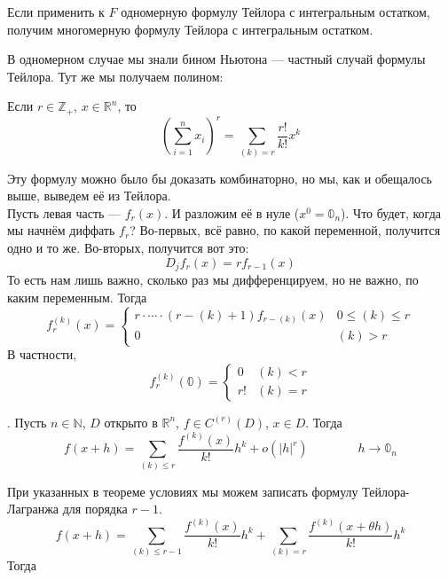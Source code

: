\documentclass{article}
\begin{document}
\begin{itemize}
\begin{Comment}
            Если применить к $F$ одномерную формулу Тейлора с интегральным остатком, получим многомерную формулу Тейлора с интегральным остатком.
        \end{Comment}
        \begin{Comment}
            В одномерном случае мы знали бином Ньютона --- частный случай формулы Тейлора. Тут же мы получаем полином:
        \end{Comment}
        \thm Если $r\in\mathbb Z_+$, $x\in\mathbb R^n$, то
        \[
        \left(\sum\limits_{i=1}^nx_i\right)^r=\sum\limits_{(k)=r}\frac{r!}{k!}x^k
        \]
        \begin{Proof}
            Эту формулу можно было бы доказать комбинаторно, но мы, как и обещалось выше, выведем её из Тейлора.\\
            Пусть левая часть --- $f_r(x)$. И разложим её в нуле ($x^0=\mathbb0_n$). Что будет, когда мы начнём диффать $f_r$? Во-первых, всё равно, по какой переменной, получится одно и то же. Во-вторых, получится вот это:
            \[
            D_jf_r(x)=rf_{r-1}(x)
            \]
            То есть нам лишь важно, сколько раз мы дифференцируем, но не важно, по каким переменным. Тогда
            \[
            f_r^{(k)}(x)=
            \begin{cases}
                r\cdot\cdots\cdot(r-(k)+1)f_{r-(k)}(x) & 0\leqslant(k)\leqslant r\\
                0 & (k)>r
            \end{cases}
            \]
            В частности, 
            \[
            f_r^{(k)}(\mathbb0)=
            \begin{cases}
                0 & (k)<r\\
                r! & (k)=r
            \end{cases}
            \]
        \end{Proof}
        \thm {}. Пусть $n\in\mathbb N$, $D$ открыто в $\mathbb R^n$, $f\in C^{(r)}(D)$, $x\in D$. Тогда
        \[
        f(x+h)=\sum\limits_{(k)\leqslant r}\frac{f^{(k)}(x)}{k!}h^k+o(|h|^r)\qquad\qquad h\to\mathbb0_n
        \]
        \begin{Proof}
            При указанных в теореме условиях мы можем записать формулу Тейлора-Лагранжа для порядка $r-1$.
            $$f(x+h)=\sum\limits_{(k)\leqslant r-1}\frac{f^{(k)}(x)}{k!}h^k+\sum\limits_{(k)=r}\frac{f^{(k)}(x+\theta h)}{k!}h^k$$
            Тогда
            \[\begin{split}

\end{split}\]
\end{Proof}
\end{itemize}
\end{document}
